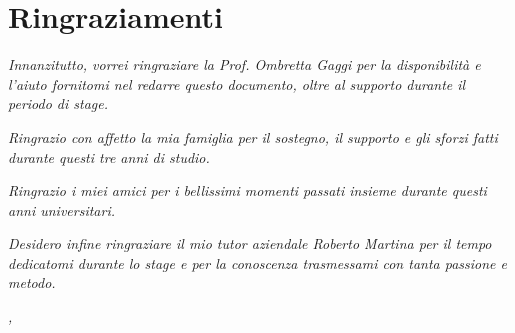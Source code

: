 \cleardoublepage
{}
{}

\bigskip

\begingroup
\let\clearpage\relax
\let\cleardoublepage\relax
\let\cleardoublepage\relax

\chapter*{Ringraziamenti}
\noindent \textit{Innanzitutto, vorrei ringraziare la Prof. Ombretta Gaggi per la disponibilità e l'aiuto fornitomi nel redarre questo documento, oltre al supporto durante il periodo di stage.}

\setlength{\parskip}{3ex}

\noindent \textit{Ringrazio con affetto la mia famiglia per il sostegno, il supporto e gli sforzi fatti durante questi tre anni di studio.}

\setlength{\parskip}{3ex}

\noindent \textit{Ringrazio i miei amici per i bellissimi momenti passati insieme durante questi anni universitari.}

\setlength{\parskip}{3ex}

\noindent \textit{Desidero infine ringraziare il mio tutor aziendale Roberto Martina per il tempo dedicatomi durante lo stage e per la conoscenza trasmessami con tanta passione e metodo.}

\bigskip

\noindent\textit{\myLocation, \myTime}
\hfill \myName

\endgroup
